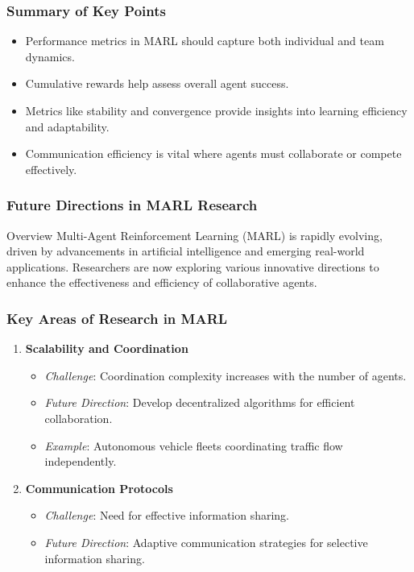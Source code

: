 \documentclass[aspectratio=169]{beamer}
\begin{document}
\begin{frame}[fragile]
    \frametitle{Summary of Key Points}
    \begin{itemize}
        \item Performance metrics in MARL should capture both individual and team dynamics.
        \item Cumulative rewards help assess overall agent success.
        \item Metrics like stability and convergence provide insights into learning efficiency and adaptability.
        \item Communication efficiency is vital where agents must collaborate or compete effectively.
    \end{itemize}
\end{frame}

\begin{frame}[fragile]
    \frametitle{Future Directions in MARL Research}
    \begin{block}{Overview}
        Multi-Agent Reinforcement Learning (MARL) is rapidly evolving, driven by advancements in artificial intelligence and emerging real-world applications. 
        Researchers are now exploring various innovative directions to enhance the effectiveness and efficiency of collaborative agents.
    \end{block}
\end{frame}

\begin{frame}[fragile]
    \frametitle{Key Areas of Research in MARL}
    \begin{enumerate}
        \item \textbf{Scalability and Coordination}
            \begin{itemize}
                \item \textit{Challenge}: Coordination complexity increases with the number of agents.
                \item \textit{Future Direction}: Develop decentralized algorithms for efficient collaboration.
                \item \textit{Example}: Autonomous vehicle fleets coordinating traffic flow independently.
            \end{itemize}

        \item \textbf{Communication Protocols}
            \begin{itemize}
                \item \textit{Challenge}: Need for effective information sharing.
                \item \textit{Future Direction}: Adaptive communication strategies for selective information sharing.
            \end{itemize}
    \end{enumerate}
\end{frame}
\end{document}
